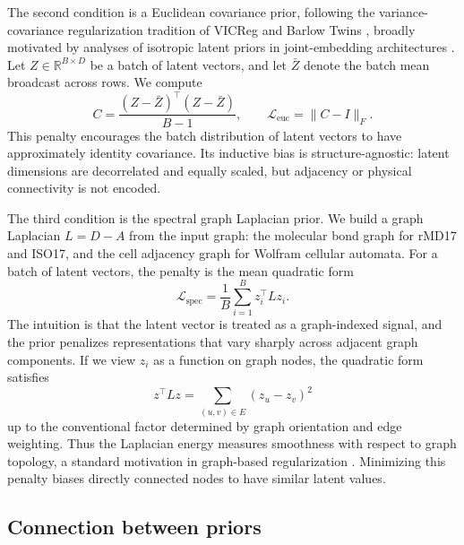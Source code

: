 The second condition is a Euclidean covariance prior, following the variance-covariance regularization tradition of VICReg \cite{vicreg} and Barlow Twins \cite{barlowtwins}, broadly motivated by analyses of isotropic latent priors in joint-embedding architectures \cite{lejepa}. Let \(Z \in \mathbb{R}^{B \times D}\) be a batch of latent vectors, and let \(\bar{Z}\) denote the batch mean broadcast across rows. We compute
\begin{equation}
C = \frac{(Z-\bar{Z})^\top (Z-\bar{Z})}{B-1},
\qquad
\mathcal{L}_{\mathrm{euc}} = \|C-I\|_F .
\end{equation}
This penalty encourages the batch distribution of latent vectors to have approximately identity covariance. Its inductive bias is structure-agnostic: latent dimensions are decorrelated and equally scaled, but adjacency or physical connectivity is not encoded.

The third condition is the spectral graph Laplacian prior. We build a graph Laplacian \(L=D-A\) from the input graph: the molecular bond graph for rMD17 and ISO17, and the cell adjacency graph for Wolfram cellular automata. For a batch of latent vectors, the penalty is the mean quadratic form
\begin{equation}
\mathcal{L}_{\mathrm{spec}}
= \frac{1}{B}\sum_{i=1}^{B} z_i^\top L z_i .
\end{equation}
The intuition is that the latent vector is treated as a graph-indexed signal, and the prior penalizes representations that vary sharply across adjacent graph components. If we view \(z_i\) as a function on graph nodes, the quadratic form satisfies
\begin{equation}
z^\top L z = \sum_{(u,v)\in E} (z_u-z_v)^2
\end{equation}
up to the conventional factor determined by graph orientation and edge weighting. Thus the Laplacian energy measures smoothness with respect to graph topology, a standard motivation in graph-based regularization \cite{belkin2003}. Minimizing this penalty biases directly connected nodes to have similar latent values.

\subsection{Connection between priors}\label{sec:connection}

